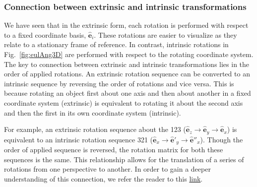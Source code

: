 \documentclass{article}
\def\eh{\hat{\mathbf{e}}}
\begin{document}
\subsubsection*{Connection between extrinsic and intrinsic transformations}

We have seen that in the extrinsic form, each rotation is performed with respect to a fixed coordinate basis, $\eh_i$. These rotations are easier to visualize as they relate to a stationary frame of reference. In contrast, intrinsic rotations in Fig.~\ref{fig:eulAng3D} are performed with respect to the rotating coordinate system. The key to connection between extrinsic and intrinsic transformations lies in the order of applied rotations. An extrinsic rotation sequence can be converted to an intrinsic sequence by reversing the order of rotations and vice versa. This is because rotating an object first about one axis and then about another in a fixed coordinate system (extrinsic) is equivalent to rotating it about the second axis and then the first in its own coordinate system (intrinsic).

For example, an extrinsic rotation sequence about the 123 ($\eh_z \rightarrow \eh_y \rightarrow \eh_x$) is equivalent to an intrinsic rotation sequence 321 ($\eh_x \rightarrow \eh'_y \rightarrow \eh''_x$). Though the order of applied sequence is reversed, the rotation matrix for both these sequences is the same. This relationship allows for the translation of a series of rotations from one perspective to another. In order to gain a deeper understanding of this connection, we refer the reader to this \href{https://dominicplein.medium.com/extrinsic-intrinsic-rotation-do-i-multiply-from-right-or-left-357c38c1abfd}{link}.
\end{document}
